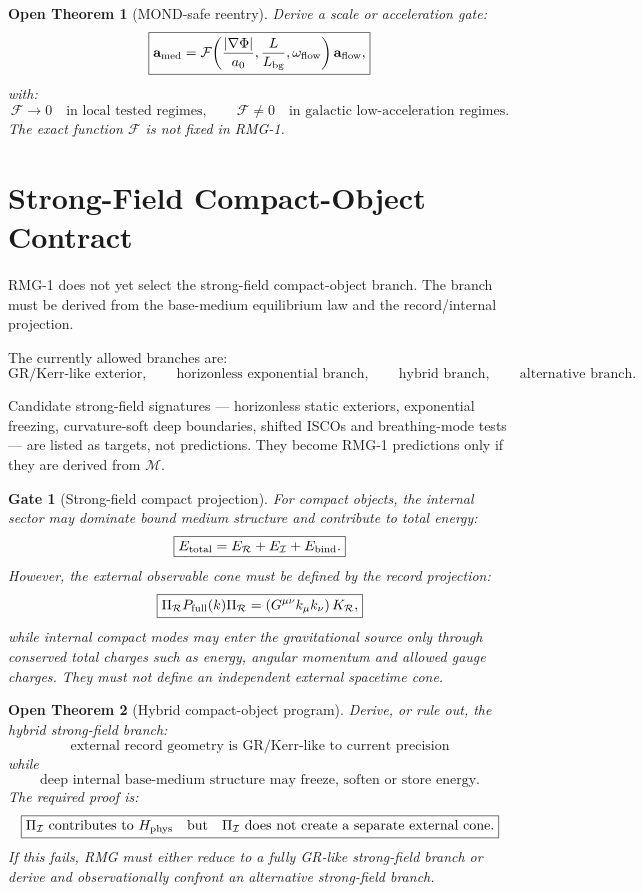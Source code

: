 \documentclass[11pt]{article}
\newtheorem{openthm}{Open Theorem}
\newtheorem{gate}{Gate}
\begin{document}
\begin{openthm}[MOND-safe reentry]
Derive a scale or acceleration gate:
\[
\boxed{
\mathbf a_{\rm med}
=
\mathcal F\!\left(
\frac{|\nabla\Phi|}{a_0},
\frac{L}{L_{\rm bg}},
\omega_{\rm flow}
\right)\mathbf a_{\rm flow},
}
\]
with:
\[
\boxed{
\mathcal F\to0
\quad\text{in local tested regimes},
\qquad
\mathcal F\neq0
\quad\text{in galactic low-acceleration regimes}.
}
\]
The exact function \(\mathcal F\) is not fixed in RMG-1.
\end{openthm}

\section{Strong-Field Compact-Object Contract}

RMG-1 does not yet select the strong-field compact-object branch.  The branch
must be derived from the base-medium equilibrium law and the record/internal
projection.

The currently allowed branches are:
\[
\boxed{
\text{GR/Kerr-like exterior},
\qquad
\text{horizonless exponential branch},
\qquad
\text{hybrid branch},
\qquad
\text{alternative branch}.
}
\]

Candidate strong-field signatures --- horizonless static exteriors,
exponential freezing, curvature-soft deep boundaries, shifted ISCOs and
breathing-mode tests --- are listed as targets, not predictions.  They become
RMG-1 predictions only if they are derived from \(\mathcal M\).

\begin{gate}[Strong-field compact projection]
For compact objects, the internal sector may dominate bound medium structure
and contribute to total energy:
\[
\boxed{
E_{\rm total}=E_{\mathcal R}+E_{\mathcal I}+E_{\rm bind}.
}
\]
However, the external observable cone must be defined by the record projection:
\[
\boxed{
\Pi_{\mathcal R}P_{\rm full}(k)\Pi_{\mathcal R}
=
\left(G^{\mu\nu}k_\mu k_\nu\right)K_{\mathcal R},
}
\]
while internal compact modes may enter the gravitational source only through
conserved total charges such as energy, angular momentum and allowed gauge
charges.  They must not define an independent external spacetime cone.
\end{gate}

\begin{openthm}[Hybrid compact-object program]
Derive, or rule out, the hybrid strong-field branch:
\[
\boxed{
\text{external record geometry is GR/Kerr-like to current precision}
}
\]
while
\[
\boxed{
\text{deep internal base-medium structure may freeze, soften or store energy.}
}
\]
The required proof is:
\[
\boxed{
\Pi_{\mathcal I}\text{ contributes to }H_{\rm phys}
\quad\text{but}\quad
\Pi_{\mathcal I}\text{ does not create a separate external cone.}
}
\]
If this fails, RMG must either reduce to a fully GR-like strong-field branch or
derive and observationally confront an alternative strong-field branch.
\end{openthm}
\end{document}
